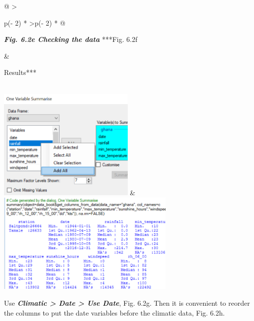 \documentclass[
  letterpaper,
  DIV=11,
  numbers=noendperiod]{scrreprt}
\begin{document}
\begin{longtable}[]{@{}
  >{\raggedright\arraybackslash}p{(\columnwidth - 2\tabcolsep) * }
  >{\centering\arraybackslash}p{(\columnwidth - 2\tabcolsep) * }@{}}
\toprule\noalign{}
\begin{minipage}[b]{\linewidth}\raggedright
\textbf{\emph{Fig. 6.2e Checking the data}} ***Fig. 6.2f
\end{minipage} & \begin{minipage}[b]{\linewidth}\centering
Results***
\end{minipage} \\
\midrule\noalign{}
\endhead
\bottomrule\noalign{}
\endlastfoot
\includegraphics[width=2.6116in,height=2.13903in]{figures/Fig6.2e.png} &
\includegraphics[width=3.41444in,height=1.93744in]{figures/Fig6.2f.png} \\
\end{longtable}

Use \textbf{\emph{Climatic \textgreater{} Date \textgreater{} Use
Date}}, Fig. 6.2g. Then it is convenient to reorder the columns to put
the date variables before the climatic data, Fig. 6.2h.
\end{document}
